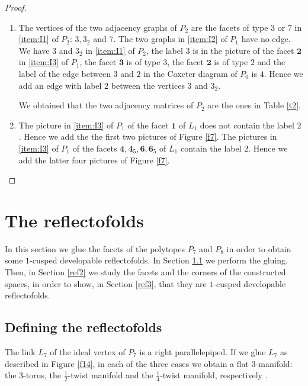 \documentclass{amsart}
\theoremstyle{definition}
\theoremstyle{remark}
\begin{document}
\begin{proof}
\begin{enumerate}
    We obtained that the list of facets of $P_2$ is $1,1_2,3,3_2,4,4_5,6,6_5,7$.

    \item[\ref{item:I2}] The vertices of the two adjacency graphs of $P_2$ are the facets of type $3$ or $7$ in \ref{item:I1} of $P_2$: $3, 3_2$ and $7$. The two graphs in \ref{item:I2} of $P_1$ have no edge. We have $3$ and $3_2$ in \ref{item:I1} of $P_{2}$, the label $3$ is in the picture of the facet $\textbf{2}$ in \ref{item:I3} of $P_1$, the facet $\textbf{3}$ is of type $3$, the facet $\textbf{2}$ is of type $2$ and the label of the edge between $3$ and $2$ in the Coxeter diagram of $P_0$ is $4$. Hence we add an edge with label $2$ between the vertices $3$ and $3_2$.

    We obtained that the two adjacency matrices of $P_2$ are the ones in Table \ref{t2}.

\item[\ref{item:I3}] The picture in \ref{item:I3} of $P_1$ of the facet $\textbf{1}$ of $L_1$ does not contain the label $2$. Hence we add the the first two pictures of Figure \ref{f7}.
The pictures in \ref{item:I3} of $P_1$ of the facets $\textbf{4},\textbf{4}_5,\textbf{6},\textbf{6}_5$ of $L_1$ contain the label $2$. Hence we add the latter four pictures of Figure \ref{f7}.
\end{enumerate}
\end{proof}


\section{The reflectofolds}\label{reflect}

In this section we glue the facets of the polytopes $P_7$ and $P_8$ in order to obtain some $1$-cusped developable reflectofolds. In Section \ref{ref1} we perform the gluing. Then, in Section \ref{ref2} we study the facets and the corners of the constructed spaces, in order to show, in Section \ref{ref3}, that they are $1$-cusped developable reflectofolds.

\subsection{Defining the reflectofolds}\label{ref1}
The link $L_7$ of the ideal vertex of $P_7$ is a right parallelepiped. If we glue $L_7$ as described in Figure \ref{f14}, in each of the three cases we obtain a flat $3$-manifold: the $3$-torus, the $\frac{1}{2}$-twist manifold  and the $\frac{1}{4}$-twist manifold, respectively \cite[Figure 12.2]{MA}.
\end{document}
